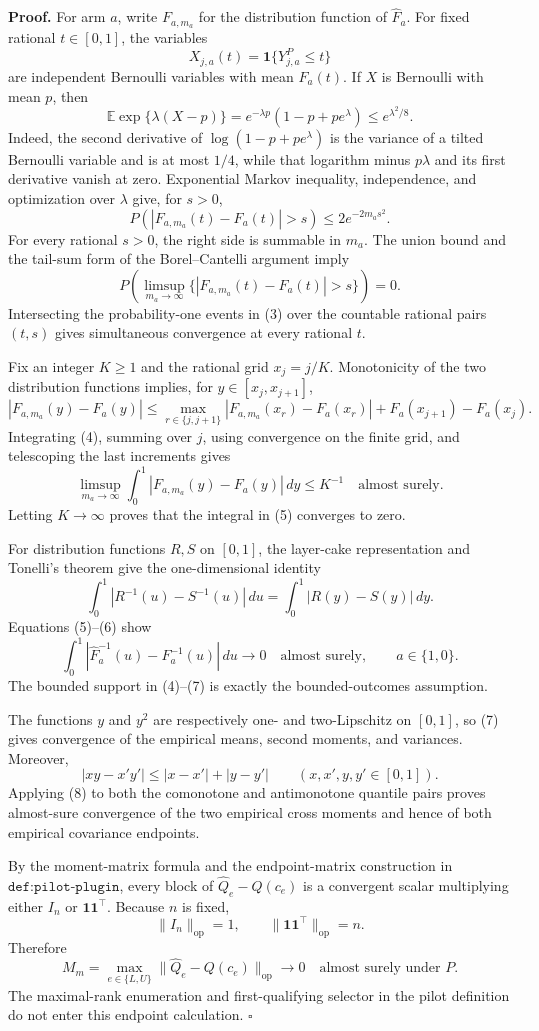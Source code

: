 \textbf{Proof.}
For arm \(a\), write \(F_{a,m_a}\) for the distribution function of \(\widehat F_a\).  For fixed rational \(t\in[0,1]\), the variables
\[
X_{j,a}(t)=\mathbf 1\{Y^P_{j,a}\le t\}
\]
are independent Bernoulli variables with mean \(F_a(t)\).  If \(X\) is Bernoulli with mean \(p\), then
\[
\mathbb E\exp\{\lambda(X-p)\}
=e^{-\lambda p}(1-p+pe^\lambda)\le e^{\lambda^2/8}.
\tag{1}
\]
Indeed, the second derivative of \(\log(1-p+pe^\lambda)\) is the variance of a tilted Bernoulli variable and is at most \(1/4\), while that logarithm minus \(p\lambda\) and its first derivative vanish at zero.  Exponential Markov inequality, independence, and optimization over \(\lambda\) give, for \(s>0\),
\[
P\!\left(\left|F_{a,m_a}(t)-F_a(t)\right|>s\right)
\le2e^{-2m_as^2}.
\tag{2}
\]
For every rational \(s>0\), the right side is summable in \(m_a\).  The union bound and the tail-sum form of the Borel--Cantelli argument imply
\[
P\!\left(\limsup_{m_a\to\infty}
\{|F_{a,m_a}(t)-F_a(t)|>s\}\right)=0.
\tag{3}
\]
Intersecting the probability-one events in (3) over the countable rational pairs \((t,s)\) gives simultaneous convergence at every rational \(t\).

Fix an integer \(K\ge1\) and the rational grid \(x_j=j/K\).  Monotonicity of the two distribution functions implies, for \(y\in[x_j,x_{j+1}]\),
\[
|F_{a,m_a}(y)-F_a(y)|
\le
\max_{r\in\{j,j+1\}}|F_{a,m_a}(x_r)-F_a(x_r)|
+F_a(x_{j+1})-F_a(x_j).
\tag{4}
\]
Integrating (4), summing over \(j\), using convergence on the finite grid, and telescoping the last increments gives
\[
\limsup_{m_a\to\infty}
\int_0^1|F_{a,m_a}(y)-F_a(y)|\,dy\le K^{-1}
\quad\text{almost surely}.
\tag{5}
\]
Letting \(K\to\infty\) proves that the integral in (5) converges to zero.

For distribution functions \(R,S\) on \([0,1]\), the layer-cake representation and Tonelli's theorem give the one-dimensional identity
\[
\int_0^1|R^{-1}(u)-S^{-1}(u)|\,du
=\int_0^1|R(y)-S(y)|\,dy.
\tag{6}
\]
Equations (5)--(6) show
\[
\int_0^1|\widehat F_a^{-1}(u)-F_a^{-1}(u)|\,du
\longrightarrow0
\quad\text{almost surely},
\qquad a\in\{1,0\}.
\tag{7}
\]
The bounded support in (4)--(7) is exactly the bounded-outcomes assumption.

The functions \(y\) and \(y^2\) are respectively one- and two-Lipschitz on \([0,1]\), so (7) gives convergence of the empirical means, second moments, and variances.  Moreover,
\[
|xy-x'y'|\le|x-x'|+|y-y'|
\qquad(x,x',y,y'\in[0,1]).
\tag{8}
\]
Applying (8) to both the comonotone and antimonotone quantile pairs proves almost-sure convergence of the two empirical cross moments and hence of both empirical covariance endpoints.

By the moment-matrix formula and the endpoint-matrix construction in \(\texttt{def:pilot-plugin}\), every block of \(\widehat Q_e-Q(c_e)\) is a convergent scalar multiplying either \(I_n\) or \(\mathbf1\mathbf1^{\top}\).  Because \(n\) is fixed,
\[
\lVert I_n\rVert_{\mathrm{op}}=1,
\qquad
\lVert\mathbf1\mathbf1^{\top}\rVert_{\mathrm{op}}=n.
\tag{9}
\]
Therefore
\[
M_m=\max_{e\in\{L,U\}}
\lVert\widehat Q_e-Q(c_e)\rVert_{\mathrm{op}}
\longrightarrow0
\quad\text{almost surely under }P.
\tag{10}
\]
The maximal-rank enumeration and first-qualifying selector in the pilot definition do not enter this endpoint calculation. \(\square\)
